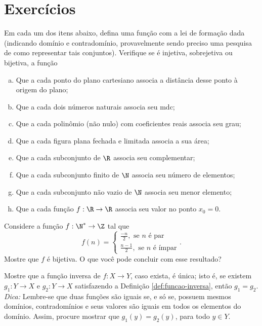 \section{Exercícios}

\begin{exercise}
Em cada um dos itens abaixo, defina uma função com a lei de
formação dada (indicando domínio e contradomínio, provavelmente sendo preciso uma pesquisa de como representar tais conjuntos). Verifique se é injetiva, sobrejetiva ou bijetiva, a função
\begin{enumerate}[(a)]
  \item Que a cada ponto do plano cartesiano associa a distância desse ponto à origem do plano;
  \item Que a cada dois números naturais associa seu mdc;
  \item Que a cada polinômio (não nulo) com coeficientes reais
  associa seu grau;
  \item Que a cada figura plana fechada e limitada associa a sua
  área;
  \item Que a cada subconjunto de $\R$ associa seu complementar;
  \item Que a cada subconjunto finito de $\N$ associa seu número de
  elementos;
  \item Que a cada subconjunto não vazio de $\N$ associa seu menor
  elemento;
  \item Que a cada função $f: \R \to \R$ associa seu valor no ponto
  $x_0 = 0$.
\end{enumerate}
\end{exercise}

\begin{exercise}
Considere a  função $f:  \N^*  \to      \Z $ tal que $$f(n) =
\begin{cases} \frac {-n} 2, \text{ se $n$ é par} \\ \frac {n-1} 2, \text{ se $n$ é
ímpar} \end{cases}.$$ Mostre que $f$ é bijetiva. O que você pode
concluir com esse resultado?
\end{exercise}

\begin{exercise}
Mostre que a função inversa de $f: X \to Y$, caso exista, é
única; isto é, se existem $g_1 : Y \to X$ e $g_2 : Y \to X$
satisfazendo a Definição \ref{def:funcao-inversa}, então $g_1 = g_2$.\\
\emph{Dica: } Lembre-se que duas funções são iguais se, e só se,
possuem mesmos domínios, contradomínios e seus valores são iguais em
todos os elementos do domínio. Assim, procure mostrar que $g_1 (y) =
g_2 (y)$, para todo $y \in Y$.
\end{exercise}

